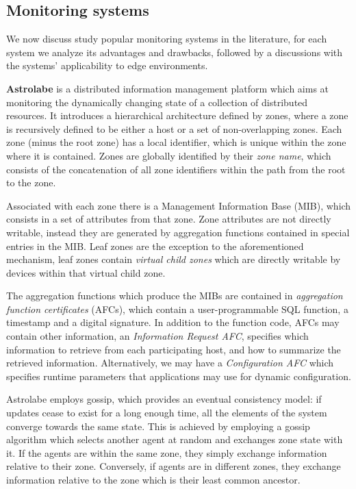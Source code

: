 
\subsection{Monitoring systems}

We now discuss study popular monitoring systems in the literature, for each system we analyze its advantages and drawbacks, followed by a discussions with the systems' applicability to edge environments.

\textbf{Astrolabe} \cite{Renesse2003} is a distributed information management platform which aims at monitoring the dynamically changing state of a collection of distributed resources. It introduces a hierarchical architecture defined by zones, where a zone is recursively defined to be either a host or a set of non-overlapping zones. Each zone (minus the root zone) has a local identifier, which is unique within the zone where it is contained. Zones are globally identified by their \textit{zone name}, which consists of the concatenation of all zone identifiers within the path from the root to the zone.

Associated with each zone there is a Management Information Base (MIB), which consists in a set of attributes from that zone. Zone attributes are not directly writable, instead they are generated by aggregation functions contained in special entries in the MIB. Leaf zones are the exception to the aforementioned mechanism, leaf zones contain \textit{virtual child zones} which are directly writable by devices within that virtual child zone.

The aggregation functions which produce the MIBs are contained in \textit{aggregation function certificates} (AFCs), which contain a user-programmable SQL function, a timestamp and a digital signature. In addition to the function code, AFCs may contain other information, an \textit{Information Request AFC},  specifies which information to retrieve from each participating host, and how to summarize the retrieved information. Alternatively, we may have a \textit{Configuration AFC} which specifies runtime parameters that applications may use for dynamic configuration.

Astrolabe employs gossip, which provides an eventual consistency model: if updates cease to exist for a long enough time, all the elements of the system  converge towards the same state. This is achieved by employing a gossip algorithm which selects another agent at random and exchanges zone state with it. If the agents are within the same zone, they simply exchange information relative to their zone. Conversely, if agents are in different zones, they exchange information relative to the zone which is their least common ancestor.


